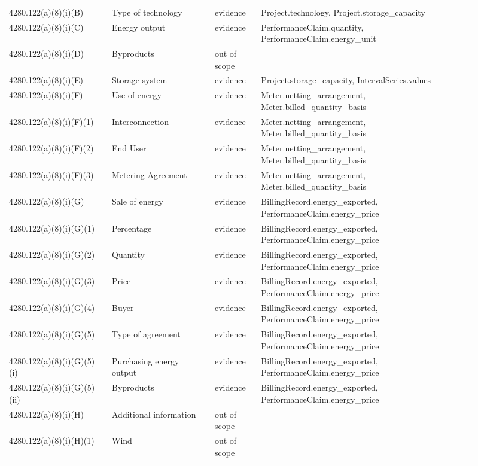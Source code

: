 \begin{longtable}{p{0.2\linewidth}p{0.2\linewidth}p{0.09\linewidth}p{0.42\linewidth}}
4280.122(a)(8)(i)(B) & Type of technology & evidence & Project.technology, Project.storage\_capacity \\
4280.122(a)(8)(i)(C) & Energy output & evidence & PerformanceClaim.quantity, PerformanceClaim.energy\_unit \\
4280.122(a)(8)(i)(D) & Byproducts & out of scope &  \\
4280.122(a)(8)(i)(E) & Storage system & evidence & Project.storage\_capacity, IntervalSeries.values \\
4280.122(a)(8)(i)(F) & Use of energy & evidence & Meter.netting\_arrangement, Meter.billed\_quantity\_basis \\
4280.122(a)(8)(i)(F)(1) & Interconnection & evidence & Meter.netting\_arrangement, Meter.billed\_quantity\_basis \\
4280.122(a)(8)(i)(F)(2) & End User & evidence & Meter.netting\_arrangement, Meter.billed\_quantity\_basis \\
4280.122(a)(8)(i)(F)(3) & Metering Agreement & evidence & Meter.netting\_arrangement, Meter.billed\_quantity\_basis \\
4280.122(a)(8)(i)(G) & Sale of energy & evidence & BillingRecord.energy\_exported, PerformanceClaim.energy\_price \\
4280.122(a)(8)(i)(G)(1) & Percentage & evidence & BillingRecord.energy\_exported, PerformanceClaim.energy\_price \\
4280.122(a)(8)(i)(G)(2) & Quantity & evidence & BillingRecord.energy\_exported, PerformanceClaim.energy\_price \\
4280.122(a)(8)(i)(G)(3) & Price & evidence & BillingRecord.energy\_exported, PerformanceClaim.energy\_price \\
4280.122(a)(8)(i)(G)(4) & Buyer & evidence & BillingRecord.energy\_exported, PerformanceClaim.energy\_price \\
4280.122(a)(8)(i)(G)(5) & Type of agreement & evidence & BillingRecord.energy\_exported, PerformanceClaim.energy\_price \\
4280.122(a)(8)(i)(G)(5)(i) & Purchasing energy output & evidence & BillingRecord.energy\_exported, PerformanceClaim.energy\_price \\
4280.122(a)(8)(i)(G)(5)(ii) & Byproducts & evidence & BillingRecord.energy\_exported, PerformanceClaim.energy\_price \\
4280.122(a)(8)(i)(H) & Additional information & out of scope &  \\
4280.122(a)(8)(i)(H)(1) & Wind & out of scope &  \\

\end{longtable}
